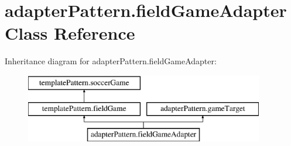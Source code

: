 \hypertarget{classadapter_pattern_1_1field_game_adapter}{}\section{adapter\+Pattern.\+field\+Game\+Adapter Class Reference}
\label{classadapter_pattern_1_1field_game_adapter}
Inheritance diagram for adapter\+Pattern.\+field\+Game\+Adapter\+:\begin{figure}[H]
\begin{center}
\leavevmode
\includegraphics[height=3.000000cm]{classadapter_pattern_1_1field_game_adapter}
\end{center}
\end{figure}
